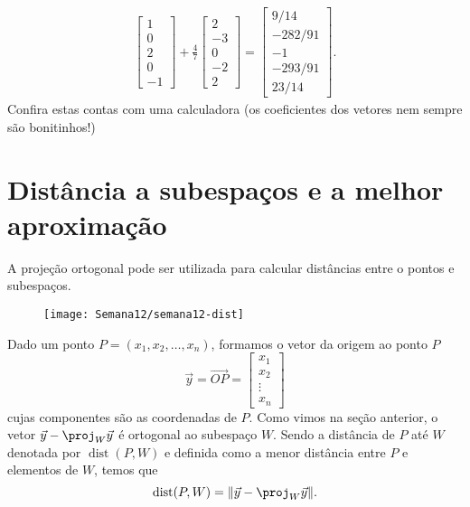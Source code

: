 \begin{ex}
\begin{align*}
\begin{bmatrix}
 1\\0\\2\\0\\-1
\end{bmatrix} + \frac{4}{7} \begin{bmatrix}
 2\\-3\\0\\-2\\ 2
\end{bmatrix} =
\begin{bmatrix}
 9/14 \\ -282/91 \\ -1 \\ -293/91 \\ 23/14
\end{bmatrix}.
  \end{align*}
Confira estas contas com uma calculadora (os coeficientes dos vetores nem sempre são bonitinhos!)
\end{ex}



\section{Distância a subespaços e a melhor aproximação}


A projeção ortogonal pode ser utilizada para calcular distâncias entre o pontos e subespaços.

\begin{figure}[h!]
\begin{center}
\texttt{[image: Semana12/semana12-dist]}
\end{center}
\end{figure}

\noindent Dado um ponto $P = (x_1, x_2, \dots, x_n)$, formamos o vetor da origem ao ponto $P$
\begin{equation}
\vec{y} = \vec{OP} =
\begin{bmatrix}
x_1 \\ x_2 \\ \vdots \\ x_n
\end{bmatrix}
\end{equation} cujas componentes são as coordenadas de $P$. Como vimos na seção anterior, o vetor $\vec{y} - \proj_{W} \vec{y}$ é ortogonal ao subespaço $W$. Sendo a distância de $P$ até $W$ denotada por $\operatorname{dist} (P,W)$ e definida como a menor distância entre $P$ e elementos de $W$, temos que
\begin{equation}
\operatorname{dist} (P,W) = \|\vec{y} - \proj_{W} \vec{y}\|.
\end{equation}


